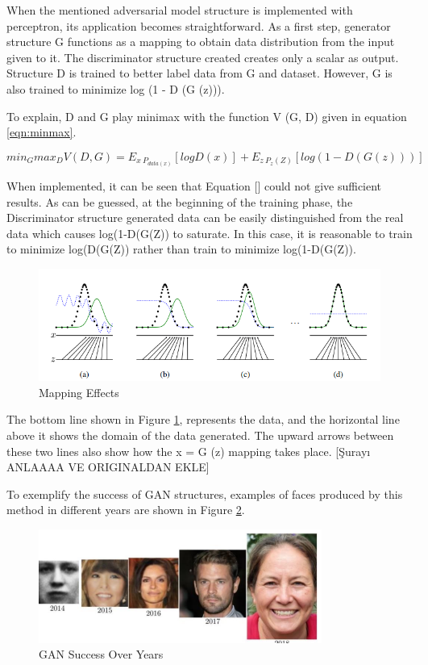 When the mentioned adversarial model structure is implemented with perceptron, its application becomes straightforward. As a first step, generator structure G functions as a mapping to obtain data distribution from the input given to it. The discriminator structure created creates only a scalar as output. Structure D is trained to better label data from G and dataset. However, G is also trained to minimize log (1 - D (G (z))).

To explain, D and G play minimax with the function V (G, D) given in equation \ref{eqn:minmax}.

\begin{equation}
\label{eqn:minmax}
    min_Gmax_D V(D,G)= E_{x~P_{data(x)}}[logD(x)]+E_{z~P_{z}(Z)}[log(1-D(G(z)))]
\end{equation}

When implemented, it can be seen that Equation [] could not give sufficient results. As can be guessed, at the beginning of the training phase, the Discriminator structure generated data can be easily distinguished from the real data which causes log(1-D(G(Z)) to saturate. In this case, it is reasonable to train to minimize log(D(G(Z)) rather than train to minimize log(1-D(G(Z)).

\begin{figure}[h]
    \centering
    \includegraphics[scale=0.7]{figures/chapter3/gan-mapping.png}
    \caption{Mapping Effects}
    \label{fig:gan-mappingl}
\end{figure}

The bottom line shown in Figure \ref{fig:gan-mappingl}, represents the data, and the horizontal line above it shows the domain of the data generated. The upward arrows between these two lines also show how the x = G (z) mapping takes place. [Şurayı ANLAAAA VE ORIGINALDAN EKLE]

To exemplify the success of GAN structures, examples of faces produced by this method in different years are shown in Figure \ref{fig:gan-success}.

\begin{figure}[h]
    \centering
    \includegraphics{figures/chapter3/gan-success-over-years.png}
    \caption{GAN Success Over Years}
    \label{fig:gan-success}
\end{figure}


